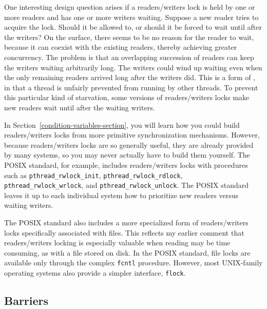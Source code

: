 One interesting design question arises if a readers/writers lock is
held by one or more readers and has one or more writers
waiting. Suppose a new reader tries to acquire the lock.  Should it be
allowed to, or should it be forced to wait until after the writers?
On the surface, there seems to be no reason for the reader to wait,
because it can coexist with the existing readers, thereby achieving
greater concurrency.  The problem is that an overlapping succession of
readers can keep the writers waiting arbitrarily long. The writers
could wind up waiting even when the only remaining readers arrived
long after the writers did.  This is a form of , in
that a thread is unfairly prevented from running by other threads.  To
prevent this particular kind of starvation,
some versions of readers/writers locks make new readers wait until
after the waiting writers.

In Section~\ref{condition-variables-section}, you will learn how you
could build readers/writers locks
from more primitive synchronization mechanisms.  However,
because readers/writers locks are so generally useful, they are already
provided by many systems, so you may never actually have to build them
yourself.  The POSIX standard, for example, includes readers/writers
locks with procedures such as \verb|pthread_rwlock_init|,
\verb|pthread_rwlock_rdlock|, \verb|pthread_rwlock_wrlock|, and
\verb|pthread_rwlock_unlock|.  The POSIX standard leaves it up to each
individual system how to prioritize new readers versus waiting
writers.

The POSIX standard also includes a more specialized form of
readers/writers locks specifically associated with files.  This
reflects my earlier comment that readers/writers locking is
especially valuable when reading may be time consuming, as with a file
stored on disk.  In the POSIX standard, file locks are available only
through the complex \verb|fcntl| procedure.  However, most UNIX-family
operating systems also provide a simpler interface, \verb|flock|.

\subsection{Barriers}\label{barriers-section}


